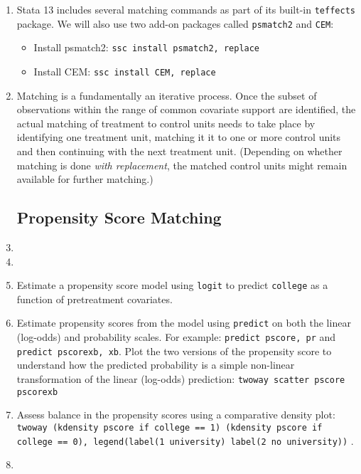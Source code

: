 \documentclass[a4paper,12pt]{article}
\begin{document}
\begin{enumerate}
\item Stata 13 includes several matching commands as part of its built-in \texttt{teffects} package. We will also use two add-on packages called \texttt{psmatch2} and \texttt{CEM}:
	\begin{itemize}
	\item Install psmatch2: \texttt{ssc install psmatch2, replace}
	\item Install CEM: \texttt{ssc install CEM, replace}
	\end{itemize}

\item Matching is a fundamentally an iterative process. Once the subset of observations within the range of common covariate support are identified, the actual matching of treatment to control units needs to take place by identifying one treatment unit, matching it it to one or more control units and then continuing with the next treatment unit. (Depending on whether matching is done {\em with replacement}, the matched control units might remain available for further matching.)

\subsection*{Propensity Score Matching}

\item %
\item %

\item Estimate a propensity score model using \texttt{logit} to predict \texttt{college} as a function of pretreatment covariates.
\item Estimate propensity scores from the model using \texttt{predict} on both the linear (log-odds) and probability scales. For example: \texttt{predict pscore, pr} and \texttt{predict pscorexb, xb}.
Plot the two versions of the propensity score to understand how the predicted probability is a simple non-linear transformation of the linear (log-odds) prediction: \texttt{twoway scatter pscore pscorexb}

\item Assess balance in the propensity scores using a comparative density plot:\\ \texttt{twoway (kdensity pscore if college == 1) (kdensity pscore if college == 0), legend(label(1 university) label(2 no university))} .

\item %




\end{enumerate}
\end{document}

